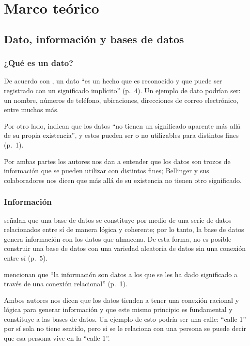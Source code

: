 \newpage

\section{Marco teórico}
\label{sec:marco-teorico}

\subsection{Dato, información y bases de datos}

\subsubsection{¿Qué es un dato?}

De acuerdo con \textcite{elmasri_navathe}, un dato \enquote{es un hecho que es reconocido y que puede ser registrado con un significado implícito} (p.~4). Un ejemplo de dato podrían ser: un nombre, números de teléfono, ubicaciones, direcciones de correo electrónico, entre muchos más.

Por otro lado, \textcite{bellinger_dikw} indican que los datos \enquote{no tienen un significado aparente más allá de su propia existencia}, y estos pueden ser o no utilizables para distintos fines (p.~1).

Por ambas partes los autores nos dan a entender que los datos son trozos de información que se pueden utilizar con distintos fines; Bellinger y sus colaboradores nos dicen que más allá de su existencia no tienen otro significado.

\subsubsection{Información}

\textcite{elmasri_navathe} señalan que una base de datos se constituye por medio de una serie de datos relacionados entre sí de manera lógica y coherente; por lo tanto, la base de datos genera información con los datos que almacena. De esta forma, no es posible construir una base de datos con una variedad aleatoria de datos sin una conexión entre sí (p.~5).

\textcite{bellinger_dikw} mencionan que \enquote{la información son datos a los que se les ha dado significado a través de una conexión relacional} (p.~1).

Ambos autores nos dicen que los datos tienden a tener una conexión racional y lógica para generar información y que este mismo principio es fundamental y constituye a las bases de datos. Un ejemplo de esto podría ser una calle: \enquote{calle 1} por sí sola no tiene sentido, pero si se le relaciona con una persona se puede decir que esa persona vive en la \enquote{calle 1}.

